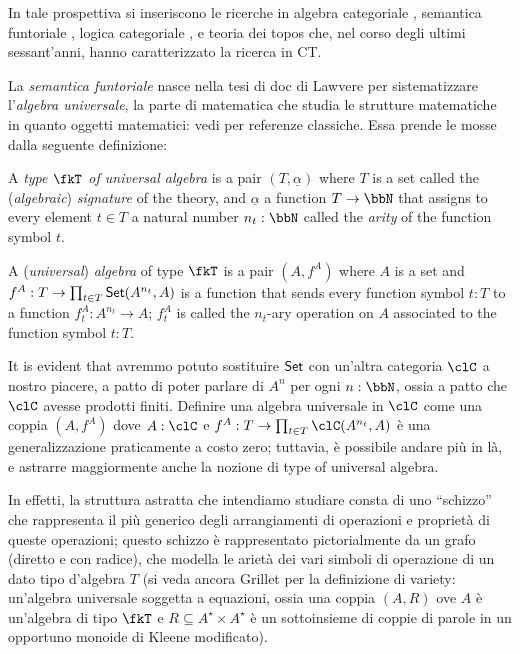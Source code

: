 In tale prospettiva si inseriscono le ricerche in algebra categoriale \cite{Janelidze2004}, semantica funtoriale \cite{lawvere1963functorial,hyland2007category}, logica categoriale \cite{lambek1988introduction}, e teoria dei topos \cite{JohnstonePT} che, nel corso degli ultimi sessant'anni, hanno caratterizzato la ricerca in CT.

La \emph{semantica funtoriale} nasce nella tesi di doc di Lawvere per sistematizzare l'\emph{algebra universale}, la parte di matematica che studia le strutture matematiche in quanto oggetti matematici: vedi \cite{manes2012algebraic} per referenze classiche. Essa prende le mosse dalla seguente definizione:
\begin{definition}
	A \emph{type $\fkT$ of universal algebra} is a pair $(T,\underline{\alpha})$ where $T$ is a set called the (\emph{algebraic}) \emph{signature} of the theory, and $\underline\alpha$ a function $T \to \bbN$ that assigns to every element $t\in T$ a natural number $n_t : \bbN$ called the \emph{arity} of the function symbol $t$.
\end{definition}
\begin{definition}
	A (\emph{universal}) \emph{algebra} of type $\fkT$ is a pair $(A,f^A)$ where $A$ is a set and $f^A : T \to \prod_{t\in T} \mathsf{Set}(A^{n_t},A )$ is a function that sends every function symbol $t : T$ to a function $f^A_t : A^{n_t} \to A$; $f^A_t$ is called the $n_t$-ary operation on $A$ associated to the function symbol $t : T$.
\end{definition}
It is evident that avremmo potuto sostituire $\mathsf{Set}$ con un'altra categoria $\clC$ a nostro piacere, a patto di poter parlare di $A^n$ per ogni $n : \bbN$, ossia a patto che $\clC$ avesse prodotti finiti. Definire una algebra universale in $\clC$ come una coppia $(A,f^A)$ dove $A : \clC$ e $f^A : T \to \prod_{t\in T} \clC(A^{n_t},A )$ è una generalizzazione praticamente a costo zero; tuttavia, è possibile andare più in là, e astrarre maggiormente anche la nozione di type of universal algebra.

In effetti, la struttura astratta che intendiamo studiare consta di uno ``schizzo'' \cite{ehresmann,lair} che rappresenta il più generico degli arrangiamenti di operazioni e proprietà di queste operazioni; questo schizzo è rappresentato pictorialmente da un grafo (diretto e con radice), che modella le arietà dei vari simboli di operazione di un dato tipo d'algebra $T$ (si veda ancora Grillet per la definizione di variety: un'algebra universale soggetta a equazioni, ossia una coppia $(A,R)$ ove $A$ è un'algebra di tipo $\fkT$ e $R\subseteq A^\star \times A^\star$ è un sottoinsieme di coppie di parole in un opportuno monoide di Kleene modificato).

